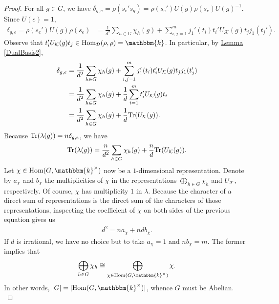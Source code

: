 \noindent\begin{proof} For all $g \in G$, we have $\delta_{g,e} = \rho(s_e's_g) = \rho(s_e')U(g)\rho(s_e)U(g)^{-1}$. Since $U(e) = 1$,
\begin{align*}
\delta_{g,e} = \rho(s_e')U(g)\rho(s_e) &= \frac{1}{{d}^2}\sum_{h \in G} \chi_h(g) + \sum_{i,j=1}^m j_1'(t_i)t_i' U_\mathcal{K}(g)t_jj_1(t_j').%
\end{align*}
\noindent Observe that $t_i' U_\mathcal{K}(g)t_j \in \homset_\mathcal{D}(\rho, \rho) = \mathbbm{k}$. In particular, by \hyperref[DualBasis2]{Lemma \ref*{DualBasis2}},
\begin{align*}
\begin{split}
\delta_{g,e} &= \frac{1}{{d}^2}\sum_{h \in G} \chi_h(g) + \sum_{i,j=1}^m j_1'(t_i)t_i'U_\mathcal{K}(g)t_jj_1(t_j')\\
&= \frac{1}{{d}^2}\sum_{h \in G} \chi_h(g) + \frac{1}{{d}}\sum_{i=1}^m t_i' U_\mathcal{K}(g)t_i\\
&= \frac{1}{{d}^2}\sum_{h \in G} \chi_h(g) + \frac{1}{{d}}\textup{Tr}(U_\mathcal{K}(g)).
\end{split}
\end{align*}
\noindent Because $\textup{Tr}(\lambda(g)) = n\delta_{g,e}$, we have
\begin{align*}
\textup{Tr}(\lambda(g)) = \frac{n}{{d}^2}\sum_{h \in G} \chi_h(g) + \frac{n}{{d}}\textup{Tr}(U_\mathcal{K}(g)).
\end{align*}
\noindent Let $\chi \in \homset(G, \mathbbm{k}^\times)$ now be a $1$-dimensional representation. Denote by $a_\chi$ and $b_\chi$ the multiplicities of $\chi$ in the representations $\bigoplus_{h \in G}\chi_h$ and $U_\mathcal{K}$, respectively. Of course, $\chi$ has multiplicity $1$ in $\lambda$. Because the character of a direct sum of representations is the direct sum of the characters of those representations, inspecting the coefficient of $\chi$ on both sides of the previous equation gives us
\begin{align*}
{d}^2 = na_\chi + n{d} b_\chi.
\end{align*}
\noindent If ${d}$ is irrational, we have no choice but to take $a_\chi = 1$ and $n b_\chi = m$. The former implies that
\begin{align*}
\bigoplus_{h \in G}\chi_h \cong \bigoplus_{\chi \in \homset(G, \mathbbm{k}^\times)}\chi.
\end{align*}
\noindent In other words, $\abs{G} = \abs{\homset(G, \mathbbm{k}^\times)}$, whence $G$ must be Abelian.\\


\end{proof}
